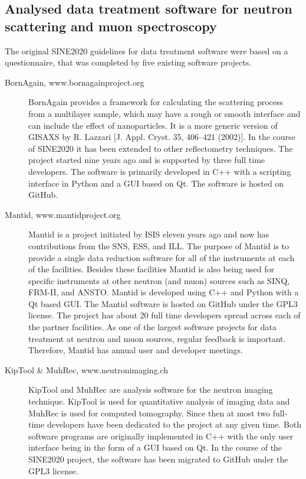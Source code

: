 \documentclass[jnr]{iosart2x}
\begin{document}
\subsection{Analysed data treatment software for neutron scattering and muon spectroscopy}
The original SINE2020 guidelines for data treatment software were based on a questionnaire, that was completed by five existing software projects.
\begin{description}
\item[BornAgain, www.bornagainproject.org] BornAgain provides a framework for calculating the scattering process from a multilayer sample, which may have a rough or smooth interface and can include the effect of nanoparticles.
It is a more generic version of GISAXS by R. Lazzari [J. Appl. Cryst. 35, 406–421 (2002)].
In the course of SINE2020 it has been extended to other reflectometry techniques.
The project started nine years ago and is supported by three full time developers.
The software is primarily developed in C++ with a scripting interface in Python and a GUI based on Qt. The software is hosted on GitHub.

\item[Mantid, www.mantidproject.org] Mantid is a project initiated by ISIS eleven years ago and now has contributions from the SNS, ESS, and ILL.
The purpose of Mantid is to provide a single data reduction software for all of the instruments at each of the facilities.
Besides these facilities Mantid is also being used for specific instruments at other neutron (and muon) sources such as SINQ, FRM-II, and ANSTO.
Mantid is developed using C++ and Python with a Qt based GUI.
The Mantid software is hosted on GitHub under the GPL3 license.
The project has about 20 full time developers spread across each of the partner facilities.
As one of the largest software projects for data treatment at neutron and muon sources, regular feedback is important.
Therefore, Mantid has annual user and developer meetings.

\item[KipTool \& MuhRec, www.neutronimaging.ch] KipTool and MuhRec are analysis software for the neutron imaging technique.
KipTool is used for quantitative analysis of imaging data and MuhRec is used for computed tomography.
Since then at most two full-time developers have been dedicated to the project at any given time.
Both software programs are originally implemented in C++ with the only user interface being in the form of a GUI based on Qt.
In the course of the SINE2020 project, the software has been migrated to GitHub under the GPL3 license.


\end{description}
\end{document}
